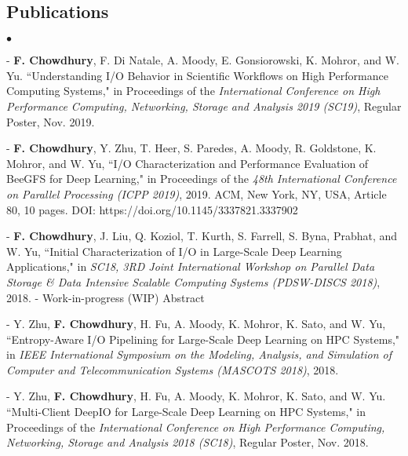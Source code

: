 \documentclass[margin,line]{res}
\newenvironment{list2}{
  \begin{list}{$\bullet$}{%
      \setlength{\itemsep}{0in}
      \setlength{\parsep}{0in} \setlength{\parskip}{0in}
      \setlength{\topsep}{0in} \setlength{\partopsep}{0in} 
      \setlength{\leftmargin}{0.2in}}}{\end{list}}
\begin{document}
\begin{resume}
\vspace*{-.1in}

\section{\sc Publications}
\begin{list2}
\item[ - ] {\bf F. Chowdhury}, F. Di Natale, A. Moody, E. Gonsiorowski, K. Mohror, and W. Yu. ``Understanding I/O Behavior in Scientific Workflows on High Performance Computing Systems," in Proceedings of the \textit{International Conference on High Performance Computing, Networking, Storage and Analysis 2019 (SC19)}, Regular Poster, Nov. 2019.
\item[ - ] {\bf F. Chowdhury}, Y. Zhu, T. Heer, S. Paredes, A. Moody, R. Goldstone, K. Mohror, and W. Yu, ``I/O Characterization and Performance Evaluation of BeeGFS for Deep Learning," in Proceedings of the \textit{48th International Conference on Parallel Processing (ICPP 2019)}, 2019. ACM, New York, NY, USA, Article 80, 10 pages. DOI: https://doi.org/10.1145/3337821.3337902
\item[ - ] {\bf F. Chowdhury}, J. Liu, Q. Koziol, T. Kurth, S. Farrell, S. Byna, Prabhat, and W. Yu, ``Initial Characterization of I/O in Large-Scale Deep Learning Applications," in \textit{SC18, 3RD Joint International Workshop on Parallel Data Storage \& Data Intensive Scalable Computing Systems (PDSW-DISCS 2018)}, 2018. - Work-in-progress (WIP) Abstract
\item[ - ] Y. Zhu, {\bf F. Chowdhury}, H. Fu, A. Moody, K. Mohror, K. Sato, and W. Yu, ``Entropy-Aware I/O Pipelining for Large-Scale Deep Learning on HPC Systems," in \textit{IEEE International Symposium on the Modeling, Analysis, and Simulation of Computer and Telecommunication Systems (MASCOTS 2018)}, 2018.
\item[ - ] Y. Zhu, {\bf F. Chowdhury}, H. Fu, A. Moody, K. Mohror, K. Sato, and W. Yu. ``Multi-Client DeepIO for Large-Scale Deep Learning on HPC Systems," in Proceedings of the \textit{International Conference on High Performance Computing, Networking, Storage and Analysis 2018 (SC18)}, Regular Poster, Nov. 2018.

\end{list2}

\vspace*{-.1in}


\end{resume}
\end{document}
